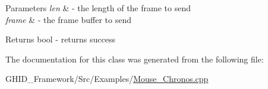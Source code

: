 \begin{DoxyParams}{\-Parameters}
{\em len} & -\/ the length of the frame to send \\
\hline
{\em frame} & -\/ the frame buffer to send \\
\hline
\end{DoxyParams}
\begin{DoxyReturn}{\-Returns}
bool -\/ returns success 
\end{DoxyReturn}


\-The documentation for this class was generated from the following file\-:\begin{DoxyCompactItemize}
\item 
\-G\-H\-I\-D\-\_\-\-Framework/\-Src/\-Examples/\hyperlink{_mouse___chronos_8cpp}{\-Mouse\-\_\-\-Chronos.\-cpp}\end{DoxyCompactItemize}
